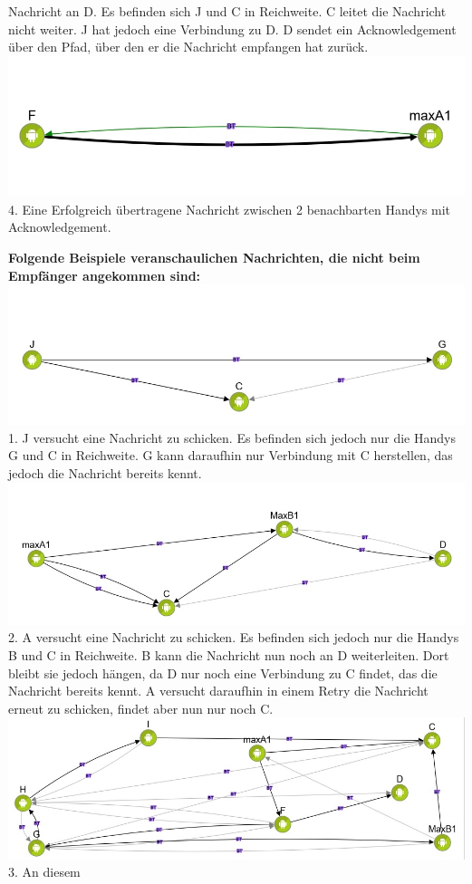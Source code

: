 Nachricht an D. Es befinden sich J und C in Reichweite. C leitet die
Nachricht nicht weiter. J hat jedoch eine Verbindung zu D. D sendet ein
Acknowledgement über den Pfad, über den er die Nachricht empfangen hat
zurück. \includegraphics[width=1.0\textwidth]{belege/grosstests/Bilder/Erfolg1.jpg} 4. Eine
Erfolgreich übertragene Nachricht zwischen 2 benachbarten Handys mit
Acknowledgement.

\textbf{Folgende Beispiele veranschaulichen Nachrichten, die nicht beim
Empfänger angekommen sind:}
\includegraphics[width=1.0\textwidth]{belege/grosstests/Bilder/Miserfolg6.jpg} 1. J versucht
eine Nachricht zu schicken. Es befinden sich jedoch nur die Handys G und
C in Reichweite. G kann daraufhin nur Verbindung mit C herstellen, das
jedoch die Nachricht bereits kennt.
\includegraphics[width=1.0\textwidth]{belege/grosstests/Bilder/Miserfolg5.jpg} 2. A versucht
eine Nachricht zu schicken. Es befinden sich jedoch nur die Handys B und
C in Reichweite. B kann die Nachricht nun noch an D weiterleiten. Dort
bleibt sie jedoch hängen, da D nur noch eine Verbindung zu C findet, das
die Nachricht bereits kennt. A versucht daraufhin in einem Retry die
Nachricht erneut zu schicken, findet aber nun nur noch C.
\includegraphics[width=1.0\textwidth]{belege/grosstests/Bilder/Miserfolg4.jpg} 3. An diesem
